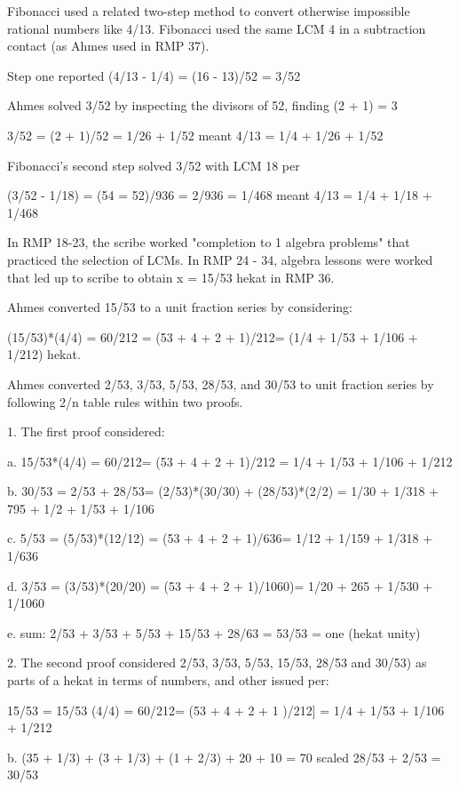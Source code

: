 \documentclass[12pt]{article}
\begin{document}
Fibonacci used a related two-step method to convert otherwise impossible rational numbers like 4/13. Fibonacci used the same LCM 4 in a subtraction contact (as Ahmes used in RMP 37).

Step one reported (4/13 - 1/4) = (16 - 13)/52 = 3/52

Ahmes solved 3/52 by inspecting the divisors of 52, finding (2 + 1) = 3

3/52 = (2 + 1)/52 = 1/26 + 1/52
meant 4/13 = 1/4 + 1/26 + 1/52

Fibonacci's second step solved 3/52 with LCM 18 per

(3/52 - 1/18) = (54 = 52)/936 = 2/936 = 1/468
meant 4/13 = 1/4 + 1/18 + 1/468

In RMP 18-23, the scribe worked "completion to 1 algebra problems" that practiced the selection of LCMs. In RMP 24 - 34, algebra lessons were worked that led up to scribe to obtain x = 15/53 hekat in RMP 36. 

Ahmes converted 15/53 to a unit fraction series by considering:
 
(15/53)*(4/4) = 60/212 = (53 + 4 + 2 + 1)/212= (1/4 + 1/53 + 1/106 + 1/212) hekat. 

Ahmes converted 2/53, 3/53, 5/53, 28/53, and 30/53 to unit fraction series by following 2/n table  rules within two proofs.

1. The first  proof considered:

a. 15/53*(4/4) = 60/212= (53 + 4 + 2 + 1)/212 = 1/4 + 1/53 + 1/106 + 1/212

b. 30/53 = 2/53 + 28/53= (2/53)*(30/30) + (28/53)*(2/2) = 1/30 + 1/318 + 795 + 1/2 + 1/53 + 1/106

c. 5/53 = (5/53)*(12/12) = (53 + 4 + 2 + 1)/636= 1/12 + 1/159 + 1/318 + 1/636

d. 3/53 = (3/53)*(20/20) = (53 + 4 + 2 + 1)/1060)= 1/20 + 265 + 1/530 + 1/1060

e. sum: 2/53 + 3/53 + 5/53 + 15/53 + 28/63 = 53/53 = one (hekat unity)

2. The second proof considered 2/53, 3/53, 5/53, 15/53, 28/53 and 30/53) as parts of a hekat in terms of  numbers, and other issued per:


15/53 = 15/53 (4/4) = 60/212= (53 + 4 + 2 + 1 )/212] = 1/4 + 1/53 + 1/106 + 1/212

b. (35 + 1/3) + (3 + 1/3) + (1 + 2/3) + 20 + 10 = 70 scaled 28/53 + 2/53 = 30/53  
\end{document}
